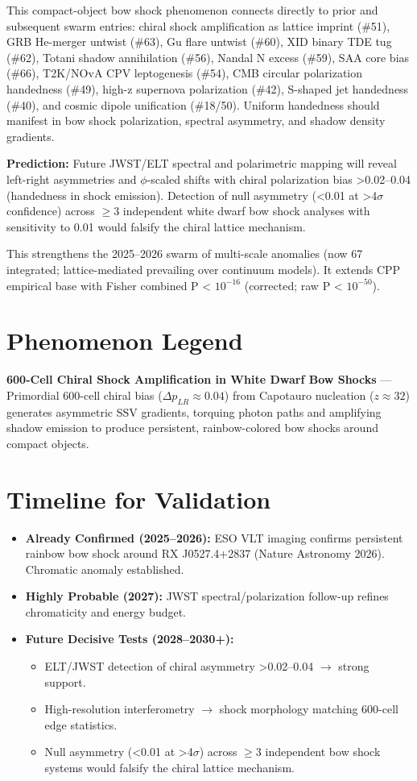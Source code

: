 \documentclass[11pt]{article}
\begin{document}
This compact-object bow shock phenomenon connects directly to prior and subsequent swarm entries: chiral shock amplification as lattice imprint (\#51), GRB He-merger untwist (\#63), Gu flare untwist (\#60), XID binary TDE tug (\#62), Totani shadow annihilation (\#56), Nandal N excess (\#59), SAA core bias (\#66), T2K/NOvA CPV leptogenesis (\#54), CMB circular polarization handedness (\#49), high-z supernova polarization (\#42), S-shaped jet handedness (\#40), and cosmic dipole unification (\#18/50). Uniform handedness should manifest in bow shock polarization, spectral asymmetry, and shadow density gradients.

\textbf{Prediction:} Future JWST/ELT spectral and polarimetric mapping will reveal left-right asymmetries and $\phi$-scaled shifts with chiral polarization bias >0.02--0.04 (handedness in shock emission). Detection of null asymmetry (<0.01 at >4$\sigma$ confidence) across $\geq 3$ independent white dwarf bow shock analyses with sensitivity to 0.01 would falsify the chiral lattice mechanism.

This strengthens the 2025--2026 swarm of multi-scale anomalies (now 67 integrated; lattice-mediated prevailing over continuum models). It extends CPP empirical base with Fisher combined P < $10^{-16}$ (corrected; raw P < $10^{-50}$).

\section{Phenomenon Legend}
\textbf{600-Cell Chiral Shock Amplification in White Dwarf Bow Shocks} — Primordial 600-cell chiral bias ($\Delta p_{LR} \approx 0.04$) from Capotauro nucleation ($z \approx 32$) generates asymmetric SSV gradients, torquing photon paths and amplifying shadow emission to produce persistent, rainbow-colored bow shocks around compact objects.

\section{Timeline for Validation}
\begin{itemize}
    \item \textbf{Already Confirmed (2025--2026):} ESO VLT imaging confirms persistent rainbow bow shock around RX J0527.4+2837 (Nature Astronomy 2026). Chromatic anomaly established.
    \item \textbf{Highly Probable (2027):} JWST spectral/polarization follow-up refines chromaticity and energy budget.
    \item \textbf{Future Decisive Tests (2028--2030+):}
    \begin{itemize}
        \item ELT/JWST detection of chiral asymmetry >0.02--0.04 $\to$ strong support.
        \item High-resolution interferometry $\to$ shock morphology matching 600-cell edge statistics.
        \item Null asymmetry (<0.01 at >4$\sigma$) across $\geq 3$ independent bow shock systems would falsify the chiral lattice mechanism.
    \end{itemize}
\end{itemize}
\end{document}
